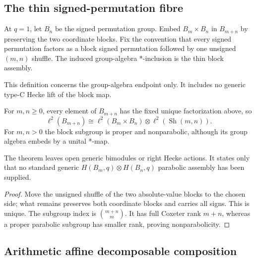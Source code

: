 \subsection{The thin signed-permutation fibre}

\begin{definition}
At $q=1$, let $B_n$ be the signed permutation group.  Embed
$B_m\times B_n$ in $B_{m+n}$ by preserving the two coordinate blocks.  Fix
the convention that every signed permutation factors as a block signed
permutation followed by one unsigned $(m,n)$ shuffle.  The induced
group-algebra *-inclusion is the thin block assembly.
\end{definition}
\begin{scope}
This definition concerns the group-algebra endpoint only.  It includes no
generic type-C Hecke lift of the block map.
\end{scope}

\begin{theorem}
{\normalfont\statusProved}\quad
For $m,n\geq0$, every element of $B_{m+n}$ has the fixed unique factorization
above, so
\[
 \ell^2(B_{m+n})\cong
 \ell^2(B_m\times B_n)\otimes\ell^2(\operatorname{Sh}(m,n)).
\]
For $m,n>0$ the block subgroup is proper and nonparabolic, although its group
algebra embeds by a unital *-map.
\end{theorem}
\begin{scope}
The theorem leaves open generic bimodules or right Hecke actions.  It states
only that no standard generic $H(B_m,q)\otimes H(B_n,q)$ parabolic assembly
has been supplied.
\end{scope}
\begin{proof}
Move the unsigned shuffle of the two absolute-value blocks to the chosen side;
what remains preserves both coordinate blocks and carries all signs.  This is
unique.  The subgroup index is $\binom{m+n}{m}$.  It has full Coxeter rank
$m+n$, whereas a proper parabolic subgroup has smaller rank, proving
nonparabolicity.
\end{proof}

\subsection{Arithmetic affine decomposable composition}

